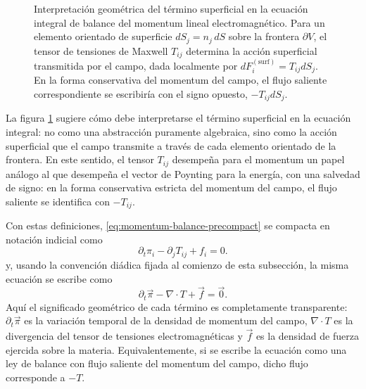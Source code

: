 \documentclass[../main.tex]{subfiles}
\begin{document}
\begin{figure}[ht]
    \endgroup
    \caption{Interpretación geométrica del término superficial en la ecuación integral de balance del momentum lineal electromagnético. Para un elemento orientado de superficie \(dS_j=n_j\,dS\) sobre la frontera \(\partial V\), el tensor de tensiones de Maxwell \(T_{ij}\) determina la acción superficial transmitida por el campo, dada localmente por \(dF_i^{(\mathrm{surf})}=T_{ij}dS_j\). En la forma conservativa del momentum del campo, el flujo saliente correspondiente se escribiría con el signo opuesto, \(-T_{ij}dS_j\).}
    \label{fig:maxwell-stress-surface-flux}
\end{figure}
La figura \ref{fig:maxwell-stress-surface-flux} sugiere cómo debe interpretarse el término superficial en la ecuación integral: no como una abstracción puramente algebraica, sino como la acción superficial que el campo transmite a través de cada elemento orientado de la frontera. En este sentido, el tensor \(T_{ij}\) desempeña para el momentum un papel análogo al que desempeña el vector de Poynting para la energía, con una salvedad de signo: en la forma conservativa estricta del momentum del campo, el flujo saliente se identifica con \(-T_{ij}\).

Con estas definiciones, \eqref{eq:momentum-balance-precompact} se compacta en notación indicial como
\begin{equation}
    \partial_t\pi_i-\partial_jT_{ij}+f_i=0.
    \label{eq:momentum-local-balance}
\end{equation}
y, usando la convención diádica fijada al comienzo de esta subsección, la misma ecuación se escribe como
\begin{equation}
    \partial_t\vec\pi-\nabla\cdot T+\vec f=\vec 0.
    \label{eq:momentum-local-balance-diadic}
\end{equation}
Aquí el significado geométrico de cada término es completamente transparente: $\partial_t\vec\pi$ es la variación temporal de la densidad de momentum del campo, $\nabla\cdot T$ es la divergencia del tensor de tensiones electromagnéticas y $\vec f$ es la densidad de fuerza ejercida sobre la materia. Equivalentemente, si se escribe la ecuación como una ley de balance con flujo saliente del momentum del campo, dicho flujo corresponde a $-T$.
\end{document}
